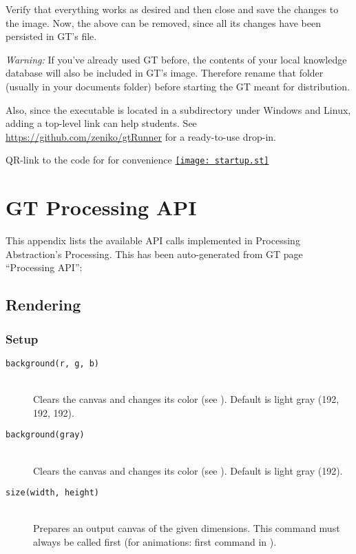 Verify that everything works as desired and then close and save the changes to the image. Now, the above  can be removed, since all its changes have been persisted in GT's  file.

\emph{Warning:} If you've already used GT before, the contents of your local knowledge database will also be included in GT's image. Therefore rename that folder (usually  in your documents folder) before starting the GT meant for distribution.

Also, since the executable  is located in a subdirectory under Windows and Linux, adding a top-level link can help students. See \url{https://github.com/zeniko/gtRunner} for a ready-to-use drop-in.

\begin{cfigure}{QR-link to the code for  for convenience}
\href{https://github.com/zeniko/gyminf-thesis/blob/main/appendix.tex}{\texttt{[image: startup.st]}}
\end{cfigure}



\chapter{GT Processing API} \label{app_api}

This appendix lists the available API calls implemented in Processing Abstraction's Processing. This has been auto-generated from GT page ``Processing API'':

\section{Rendering}

\subsection{Setup}
\begin{description}
\item[\texttt{background(r, g, b)}] \hfill \\
	Clears the canvas and changes its color (see ). Default is light gray (192, 192, 192).
\item[\texttt{background(gray)}] \hfill \\
	Clears the canvas and changes its color (see ). Default is light gray (192).
\item[\texttt{size(width, height)}] \hfill \\
	Prepares an output canvas of the given dimensions. This command must always be called first (for animations: first command in ).
\end{description}

